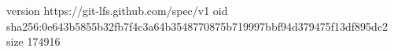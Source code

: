 version https://git-lfs.github.com/spec/v1
oid sha256:0e643b5855b32fb7f4c3a64b3548770875b719997bbf94d379475f13df895dc2
size 174916
